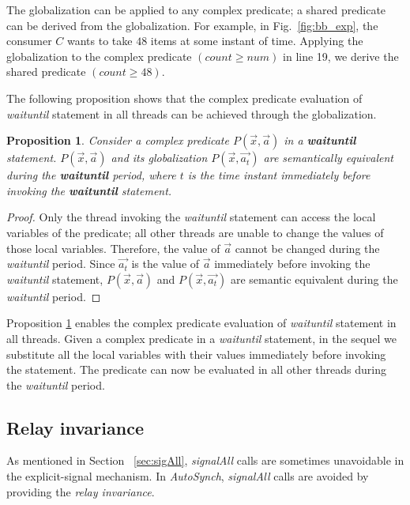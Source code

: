 \documentclass{sigplanconf}
\newtheorem{proposition}{Proposition}
\begin{document}
The globalization can be applied to any complex predicate; a shared 
predicate can be derived from the globalization. For example, in
Fig.~\ref{fig:bb_exp}, the consumer $C$ wants to take $48$ items at some
instant of time. Applying the globalization to the complex predicate $(count \ge num)$
in line 19, we derive the shared predicate $(count \ge 48)$.

The following proposition shows that the complex predicate evaluation of
{\em waituntil} statement in all threads can be achieved through the globalization. 
\begin{proposition} \label{pro:glob}
    Consider a complex predicate $P(\vec{x}, \vec{a})$ in a \textbf
    {waituntil} 
    statement. $P(\vec{x}, \vec{a})$ and its globalization 
    $P(\vec{x}, \vec{a_t})$ are semantically equivalent during the \textbf{waituntil} 
    period, where $t$ is the time instant immediately before invoking the 
    \textbf{waituntil} statement.  
\end{proposition}
\begin{proof}
    Only the thread invoking the {\em waituntil} statement can access the
    local variables of the predicate; all other threads are unable to change
    the values of those local variables. Therefore, the value of $\vec{a}$
    cannot be changed 
    during the {\em waituntil} period. Since $\vec{a_t}$ is the value of $\vec{a}$
    immediately before invoking the {\em waituntil} statement, $P(\vec{x}, \vec{a})$
    and $P(\vec{x}, \vec{a_t})$ are semantic equivalent during the {\em waituntil}
    period. 
\end{proof}

Proposition \ref{pro:glob} enables the complex predicate evaluation of
{\em waituntil} statement in all threads. 
Given a complex predicate in a {\em waituntil} statement, in the sequel we substitute
all the local variables with their values immediately before invoking the
statement. The predicate can now be evaluated in all other threads during the
{\em waituntil} period. 

\subsection{Relay invariance} \label{sec:relay}
As mentioned in Section ~\ref{sec:sigAll}, {\em signalAll} calls are sometimes unavoidable
in the explicit-signal mechanism. In {\em AutoSynch}, {\em signalAll} calls are 
avoided by providing the {\em relay invariance}. 
\end{document}
